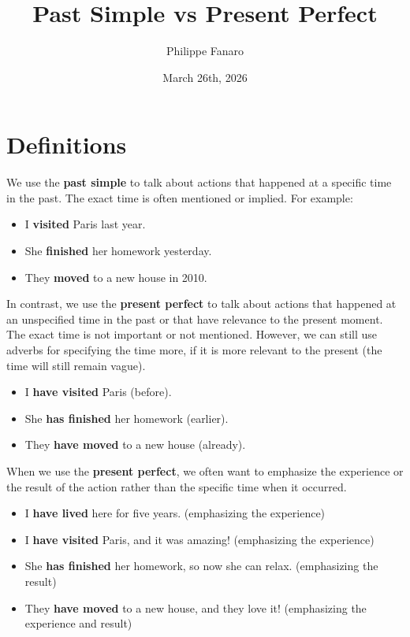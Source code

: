 \documentclass[12pt]{article}
\title{Past Simple vs Present Perfect}
\author{Philippe Fanaro}
\date{March 26th, 2026}
\begin{document}
\maketitle

\section{Definitions}

We use the \textbf{past simple} to talk about actions that happened at a specific time in the past. The exact time is often mentioned or implied. For example:

\begin{itemize}
  \item I \textbf{visited} Paris last year.
  \item She \textbf{finished} her homework yesterday.
  \item They \textbf{moved} to a new house in 2010.
\end{itemize}

In contrast, we use the \textbf{present perfect} to talk about actions that happened at an unspecified time in the past or that have relevance to the present moment. The exact time is not important or not mentioned. However, we can still use adverbs for specifying the time more, if it is more relevant to the present (the time will still remain vague).

\begin{itemize}
  \item I \textbf{have visited} Paris (before).
  \item She \textbf{has finished} her homework (earlier).
  \item They \textbf{have moved} to a new house (already).
\end{itemize}

When we use the \textbf{present perfect}, we often want to emphasize the experience or the result of the action rather than the specific time when it occurred.

\begin{itemize}
  \item I \textbf{have lived} here for five years. (emphasizing the experience)
  \item I \textbf{have visited} Paris, and it was amazing! (emphasizing the experience)
  \item She \textbf{has finished} her homework, so now she can relax. (emphasizing the result)
  \item They \textbf{have moved} to a new house, and they love it! (emphasizing the experience and result)
\end{itemize}
\end{document}
